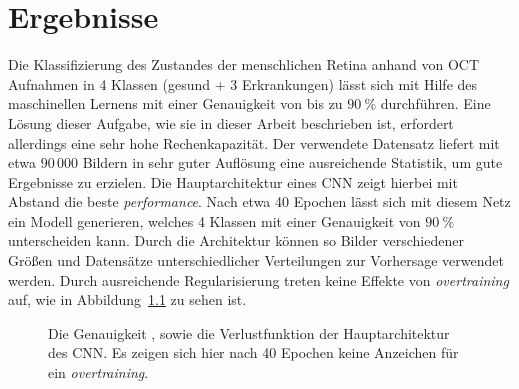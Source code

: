 \chapter{Ergebnisse}

Die Klassifizierung des Zustandes der menschlichen Retina anhand von OCT
Aufnahmen in 4 Klassen (gesund + 3 Erkrankungen) lässt sich mit Hilfe des
maschinellen Lernens mit einer Genauigkeit von bis zu $\SI{90}{\percent}$
durchführen. Eine Lösung dieser Aufgabe, wie sie in dieser Arbeit beschrieben
ist, erfordert allerdings eine sehr hohe Rechenkapazität. Der verwendete
Datensatz liefert mit etwa $90\,000$ Bildern in sehr guter Auflösung eine
ausreichende Statistik, um gute Ergebnisse zu erzielen.
Die Hauptarchitektur eines CNN zeigt hierbei mit Abstand die beste
\textit{performance}. Nach etwa 40 Epochen lässt sich mit diesem Netz ein
Modell generieren, welches 4 Klassen mit einer Genauigkeit von
$\SI{90}{\percent}$ unterscheiden kann. Durch die Architektur können so Bilder
verschiedener Größen und Datensätze unterschiedlicher Verteilungen zur
Vorhersage verwendet werden. Durch ausreichende Regularisierung treten keine
Effekte von \textit{overtraining} auf, wie in Abbildung~\ref{fig:hist} zu sehen
ist.
%
\begin{figure}[h!]
  \caption{Die Genauigkeit \protect{}, sowie die Verlustfunktion \protect{} der Hauptarchitektur des CNN. Es zeigen sich hier nach 40 Epochen keine Anzeichen für ein \textit{overtraining}.}
  \label{fig:hist}
\end{figure}
